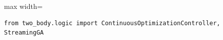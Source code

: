\begin{listing}[H]
\caption{Ejemplo de importación desde la API póblica}
\begin{adjustbox}{max width=\textwidth}
\begin{minipage}{\textwidth}
\begin{verbatim}
from two_body.logic import ContinuousOptimizationController, StreamingGA
\end{verbatim}
\end{minipage}
\end{adjustbox}
\end{listing}

